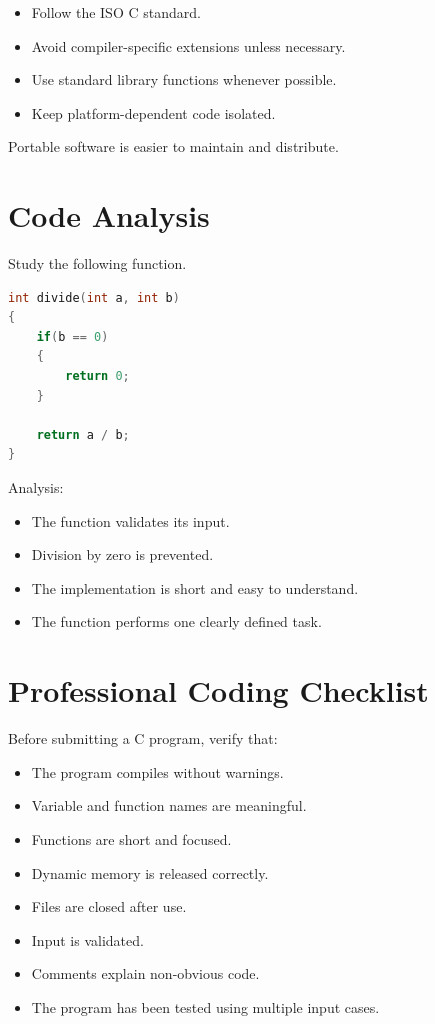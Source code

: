 \documentclass[12pt,openany]{book}
\begin{document}
\begin{itemize}
    \item Follow the ISO C standard.
    \item Avoid compiler-specific extensions unless necessary.
    \item Use standard library functions whenever possible.
    \item Keep platform-dependent code isolated.
\end{itemize}

Portable software is easier to maintain and distribute.

\section{Code Analysis}

Study the following function.

\begin{lstlisting}[language=C]
int divide(int a, int b)
{
    if(b == 0)
    {
        return 0;
    }

    return a / b;
}
\end{lstlisting}

Analysis:

\begin{itemize}
    \item The function validates its input.
    \item Division by zero is prevented.
    \item The implementation is short and easy to understand.
    \item The function performs one clearly defined task.
\end{itemize}

\section{Professional Coding Checklist}

Before submitting a C program, verify that:

\begin{itemize}
    \item The program compiles without warnings.
    \item Variable and function names are meaningful.
    \item Functions are short and focused.
    \item Dynamic memory is released correctly.
    \item Files are closed after use.
    \item Input is validated.
    \item Comments explain non-obvious code.
    \item The program has been tested using multiple input cases.
\end{itemize}
\end{document}
